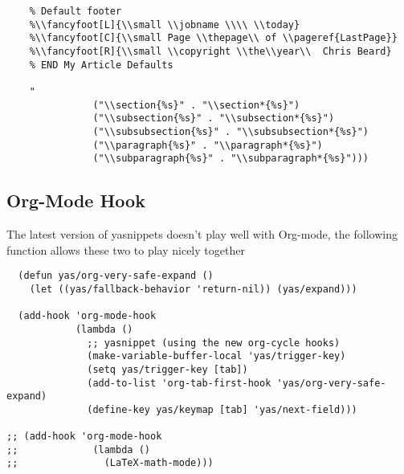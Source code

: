 \documentclass[11pt]{article}
\begin{document}
\begin{verbatim}
    % Default footer
    %\\fancyfoot[L]{\\small \\jobname \\\\ \\today}
    %\\fancyfoot[C]{\\small Page \\thepage\\ of \\pageref{LastPage}}
    %\\fancyfoot[R]{\\small \\copyright \\the\\year\\  Chris Beard}
    % END My Article Defaults
    
    "
               ("\\section{%s}" . "\\section*{%s}")
               ("\\subsection{%s}" . "\\subsection*{%s}")
               ("\\subsubsection{%s}" . "\\subsubsection*{%s}")
               ("\\paragraph{%s}" . "\\paragraph*{%s}")
               ("\\subparagraph{%s}" . "\\subparagraph*{%s}")))
\end{verbatim}
\subsection*{Org-Mode Hook}
\label{sec-1_2}

The latest version of yasnippets doesn't play well with Org-mode, the
following function allows these two to play nicely together
\begin{verbatim}
  (defun yas/org-very-safe-expand ()
    (let ((yas/fallback-behavior 'return-nil)) (yas/expand)))
  
  (add-hook 'org-mode-hook
            (lambda ()
              ;; yasnippet (using the new org-cycle hooks)
              (make-variable-buffer-local 'yas/trigger-key)
              (setq yas/trigger-key [tab])
              (add-to-list 'org-tab-first-hook 'yas/org-very-safe-expand)
              (define-key yas/keymap [tab] 'yas/next-field)))

;; (add-hook 'org-mode-hook
;;             (lambda ()
;;               (LaTeX-math-mode)))
\end{verbatim}
\end{document}
